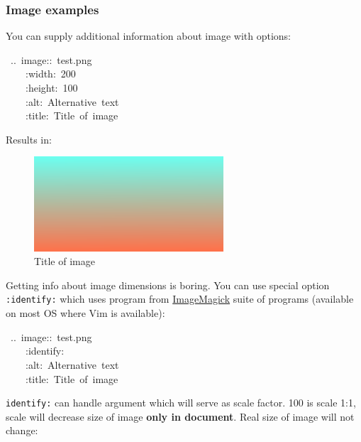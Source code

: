 \documentclass[12pt]{article}
\begin{document}
\subsubsection{Image examples}

You can supply additional information about image with options:

\begin{ttfamily}\begin{flushleft}
\mbox{~..~image::~test.png}\\
\mbox{~~~~:width:~200}\\
\mbox{~~~~:height:~100}\\
\mbox{~~~~:alt:~Alternative~text}\\
\mbox{~~~~:title:~Title~of~image}\\
\end{flushleft}\end{ttfamily}

Results in:

\begin{figure}[ht]\centering\includegraphics[height=100pt, width=200pt]{test.png}\caption{Title of image}\end{figure}
Getting info about image dimensions is boring. You can use special
option \texttt{:identify:} which uses program from \href{http://www.imagemagick.org}{ImageMagick} suite
of programs (available on most OS where Vim is available):

\begin{ttfamily}\begin{flushleft}
\mbox{~..~image::~test.png}\\
\mbox{~~~~:identify:}\\
\mbox{~~~~:alt:~Alternative~text}\\
\mbox{~~~~:title:~Title~of~image}\\
\end{flushleft}\end{ttfamily}

\texttt{identify:} can handle argument which will serve as scale factor. 100
is scale 1:1, scale will decrease size of image \textbf{only in document}. Real
size of image will not change:
\end{document}
